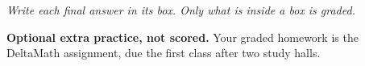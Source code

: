 \documentclass[12pt]{article}
\begin{document}
{\small\itshape Write each final answer in its box. Only what is inside a box is graded.}\par

\vspace{0.04in}

\boxguard[8]
\begin{remindbox}
\small
\textbf{Optional extra practice, not scored.} Your graded homework is the DeltaMath assignment,
due the first class after two study halls.
\end{remindbox}

\vspace{0.04in}

\boxguard[30]
\end{document}
